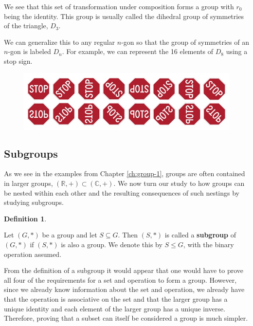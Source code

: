 \documentclass[
]{book}
\theoremstyle{definition}
\newtheorem{definition}{Definition}[chapter]
\theoremstyle{definition}
\theoremstyle{definition}
\theoremstyle{definition}
\theoremstyle{remark}
\begin{document}
We see that this set of transformation under composition forms a group with \(r_0\) being the identity. This group is usually called the dihedral group of symmetries of the triangle, \(D_3\).

We can generalize this to any regular \(n\)-gon so that the group of symmetries of an \(n\)-gon is labeled \(D_n\). For example, we can represent the 16 elements of \(D_8\) using a stop sign.

\begin{figure}

{\centering \includegraphics[width=0.7\linewidth]{images/D8Group} 

}

\end{figure}

\hypertarget{subgroups}{%
\subsection{Subgroups}\label{subgroups}}

As we see in the examples from Chapter \ref{ch:group-1}, groups are often contained in larger groups, \((\mathbb{R},+)\subset (\mathbb{C},+)\). We now turn our study to how groups can be nested within each other and the resulting consequences of such nestings by studying subgroups.

\begin{definition}
\protect\hypertarget{def:unlabeled-div-215}{}\label{def:unlabeled-div-215}

Let \((G,*)\) be a group and let \(S\subseteq G\). Then \((S,*)\) is called a \textbf{subgroup} of \((G,*)\) if \((S,*)\) is also a group. We denote this by \(S \leq G\), with the binary operation assumed.

\end{definition}

From the definition of a subgroup it would appear that one would have to prove all four of the requirements for a set and operation to form a group. However, since we already know information about the set and operation, we already have that the operation is associative on the set and that the larger group has a unique identity and each element of the larger group has a unique inverse. Therefore, proving that a subset can itself be considered a group is much simpler.
\end{document}
